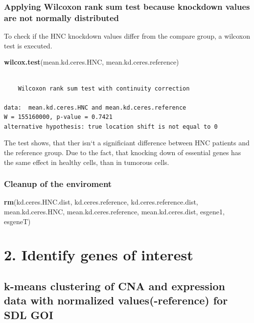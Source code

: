 \documentclass[]{article}
\newenvironment{Shaded}{\begin{snugshade}}{\end{snugshade}}
\newcommand{\KeywordTok}[1]{\textcolor[rgb]{0.13,0.29,0.53}{\textbf{#1}}}
\newcommand{\NormalTok}[1]{#1}
\begin{document}
\subsubsection{Applying Wilcoxon rank sum test because knockdown values
are not normally
distributed}\label{applying-wilcoxon-rank-sum-test-because-knockdown-values-are-not-normally-distributed}

To check if the HNC knockdown values differ from the compare group, a
wilcoxon test is executed.

\begin{Shaded}
\begin{Highlighting}[]
\KeywordTok{wilcox.test}\NormalTok{(mean.kd.ceres.HNC, mean.kd.ceres.reference)}
\end{Highlighting}
\end{Shaded}

\begin{verbatim}

    Wilcoxon rank sum test with continuity correction

data:  mean.kd.ceres.HNC and mean.kd.ceres.reference
W = 155160000, p-value = 0.7421
alternative hypothesis: true location shift is not equal to 0
\end{verbatim}

The test shows, that ther isn`t a significiant difference between HNC
patients and the reference group. Due to the fact, that knocking down of
essential genes has the same effect in healthy cells, than in tumorous
cells.

\subsubsection{Cleanup of the
enviroment}\label{cleanup-of-the-enviroment-2}

\begin{Shaded}
\begin{Highlighting}[]
\KeywordTok{rm}\NormalTok{(kd.ceres.HNC.dist, kd.ceres.reference, kd.ceres.reference.dist, mean.kd.ceres.HNC, mean.kd.ceres.reference, mean.kd.ceres.dist, esgene1, esgeneT)}
\end{Highlighting}
\end{Shaded}

\section{2. Identify genes of
interest}\label{identify-genes-of-interest}

\subsection{k-means clustering of CNA and expression data with
normalized values(-reference) for SDL
GOI}\label{k-means-clustering-of-cna-and-expression-data-with-normalized-values-reference-for-sdl-goi}
\end{document}
